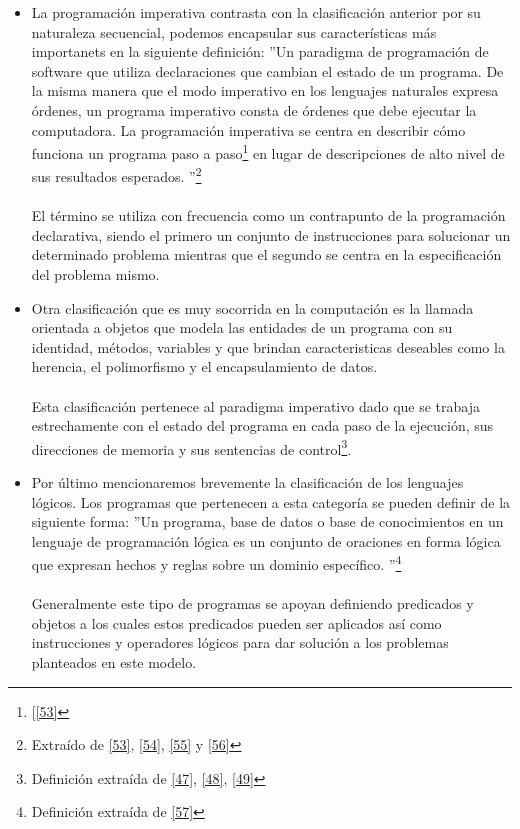 \begin{itemize}
        \item  La programación imperativa contrasta con la clasificación anterior por su naturaleza secuencial, podemos encapsular sus características más importanets en la siguiente definición: 
         ''Un paradigma de programación de software que utiliza declaraciones que cambian el estado de un programa. De la misma manera que el modo imperativo en los lenguajes naturales expresa órdenes, un programa imperativo consta de órdenes que debe ejecutar la computadora. La programación imperativa se centra en describir cómo funciona un programa paso a paso\footnote{[\hyperlink{53}{[53]}} en lugar de descripciones de alto nivel de sus resultados esperados. ''\footnote{Extraído de \hyperlink{53}{[53]}, \hyperlink{54}{[54]}, \hyperlink{55}{[55]} y \hyperlink{56}{[56]}}\\\\
        El término se utiliza con frecuencia como un contrapunto de la programación declarativa, siendo el primero un conjunto de instrucciones para solucionar un determinado problema mientras que el segundo se centra en la especificación del problema mismo.\\

        \item     Otra clasificación que es muy socorrida en la computación es la llamada orientada a objetos que modela las entidades de un programa con su identidad, métodos, variables y que brindan caracteristicas deseables como la herencia, el polimorfismo y el encapsulamiento de datos.\\\\
        Esta clasificación pertenece al paradigma imperativo dado que se trabaja estrechamente con el estado del programa en cada paso de la ejecución, sus direcciones de memoria y sus sentencias de control\footnote{Definición extraída de \hyperlink{47}{[47]}, \hyperlink{48}{[48]}, \hyperlink{49}{[49]}}.\\
    
        \item     Por último mencionaremos brevemente la clasificación de los lenguajes lógicos. Los programas que pertenecen a esta categoría se pueden definir de la siguiente forma:  ''Un programa, base de datos o base de conocimientos en un lenguaje de programación lógica es un conjunto de oraciones en forma lógica que expresan hechos y reglas sobre un dominio específico. ''\footnote{Definición extraída de \hyperlink{57}{[57]}} \\\\
        Generalmente este tipo de programas se apoyan definiendo predicados y objetos a los cuales estos predicados pueden ser aplicados así como instrucciones y operadores lógicos para dar solución a los problemas planteados en este modelo.

    
    \end{itemize}

